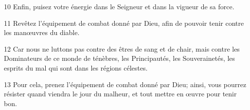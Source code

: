 
10 Enfin, puisez votre énergie dans le Seigneur et dans la vigueur de sa force.

11 Revêtez l’équipement de combat donné par Dieu, afin de pouvoir tenir contre les manœuvres du diable.

12 Car nous ne luttons pas contre des êtres de sang et de chair, mais contre les Dominateurs de ce monde de ténèbres, les Principautés, les Souverainetés, les esprits du mal qui sont dans les régions célestes.

13 Pour cela, prenez l’équipement de combat donné par Dieu; ainsi, vous pourrez résister quand viendra le jour du malheur, et tout mettre en œuvre pour tenir bon.